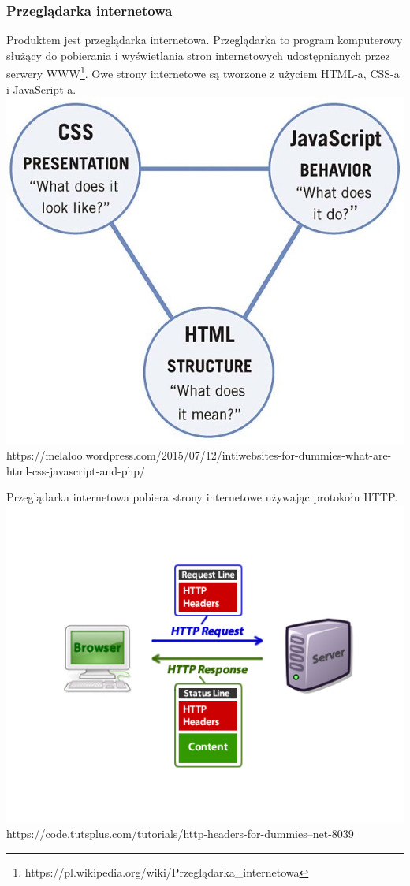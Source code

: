 \documentclass[polish,12pt]{aghthesis}
\begin{document}
\subsubsection{Przeglądarka internetowa}
Produktem jest przeglądarka internetowa. Przeglądarka to  program komputerowy służący do pobierania i wyświetlania stron internetowych udostępnianych przez serwery WWW\footnote{https://pl.wikipedia.org/wiki/Przeglądarka_internetowa}.
Owe strony internetowe są tworzone z użyciem HTML-a, CSS-a i JavaScript-a.
\includegraphics[width=\textwidth]{html-css-js}
https://melaloo.wordpress.com/2015/07/12/intiwebsites-for-dummies-what-are-html-css-javascript-and-php/

Przeglądarka internetowa pobiera strony internetowe używając protokołu HTTP.
\includegraphics[width=\textwidth]{http_diagram}
https://code.tutsplus.com/tutorials/http-headers-for-dummies--net-8039
\end{document}
